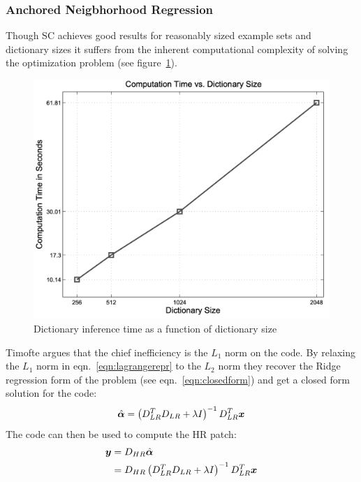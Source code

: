 \subsubsection{Anchored Neigbhorhood Regression}
Though SC achieves good results for reasonably sized example sets and dictionary sizes it suffers from the inherent computational complexity of solving the optimization problem (see figure~\ref{fig:dictspeedspize}).
\begin{figure}
	\centering
	\includegraphics[width=\linewidth,keepaspectratio]{figures/dictsizespeed.png}
	\caption{Dictionary inference time as a function of dictionary size\cite{yang2010}}
	\label{fig:dictspeedspize}
\end{figure}
%
Timofte \etal\cite{Timofte} argues that the chief inefficiency is the $L_1$ norm on the code.
%
By relaxing the $L_1$ norm in eqn.~\eqref{eqn:lagrangerepr} to the $L_2$ norm they recover the Ridge regression form of the problem (see eqn.~\eqref{eqn:closedform}) and get a closed form solution for the code:
\begin{equation}
	\hat{\bm{\alpha}} = \left( D_{LR}^T D_{LR} + \lambda I\right)^{-1}D_{LR}^T \bm{x}
\end{equation}
The code can then be used to compute the HR patch:
\begin{align}
	\by & = D_{HR} \hat{\bm{\alpha}}                                                               \\
	    & = D_{HR} \left( D_{LR}^T D_{LR} + \lambda I\right)^{-1}D_{LR}^T \label{eqn:mappinglr}\bx
\end{align}
